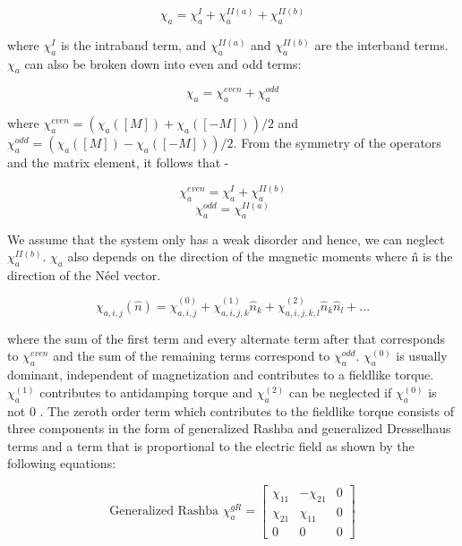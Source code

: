 \documentclass[10pt,doublespacing,edeposit]{uiucthesis2020}
\begin{document}
\begin{mainmatter}
\begin{equation}
\chi_a = \chi_a^I + \chi_a^{II(a)} + \chi_a^{II(b)}
\end{equation}

where $\chi_a^I$ is the intraband term, and $\chi_a^{II(a)}$ and $\chi_a^{II(b)}$ are the interband terms. $\chi_a$ can also be broken down into even and odd terms:

\begin{equation}
\chi_a = \chi_a^{even} + \chi_a^{odd}
\end{equation}

where $\chi_a^{even} = (\chi_a([M])+\chi_a([-M]))/2$ and $\chi_a^{odd} = (\chi_a([M])-\chi_a([-M]))/2$. From the symmetry of the operators and the matrix element, it follows that -

\begin{equation}
\chi_a^{even} = \chi_a^{I} + \chi_a^{II(b)}
\end{equation}
\begin{equation}
\chi_a^{odd} = \chi_a^{II(a)}
\end{equation}

We assume that the system only has a weak disorder and hence, we can neglect $\chi_a^{II(b)}$. $\chi_a$ also depends on the direction of the magnetic moments where \^n is the direction of the N\'eel vector.

\begin{equation}
\chi_{a,i,j}(\hat{n}) = \chi_{a,i,j}^{(0)} + \chi_{a,i,j,k}^{(1)}\hat{n}_k + \chi_{a,i,j,k,l}^{(2)}\hat{n}_k\hat{n}_l + ...
\end{equation}

where the sum of the first term and every alternate term after that corresponds to $\chi_a^{even}$ and the sum of the remaining terms correspond to $\chi_a^{odd}$. $\chi_a^{(0)}$ is usually dominant, independent of magnetization and contributes to a fieldlike torque. $\chi_a^{(1)}$ contributes to antidamping torque and $\chi_a^{(2)}$ can be neglected if $\chi_a^{(0)}$ is not 0 \cite{Zelezny2017}. The zeroth order term which contributes to the fieldlike torque consists of three components in the form of generalized Rashba and generalized Dresselhaus terms and a term that is proportional to the electric field as shown by the following equations:

\begin{equation}
\text{Generalized Rashba } \chi_a^{gR} = \begin{bmatrix} \chi_{11} & -\chi_{21} & 0 \\ \chi_{21} & \chi_{11} & 0 \\ 0 & 0 & 0 \end{bmatrix}
\end{equation}


\end{mainmatter}
\end{document}
